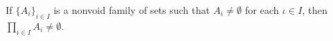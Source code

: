 If \(\{A_i\}_{i \in I}\) is a nonvoid family of sets such that \(A_i \neq \emptyset\) for each \(\iota \in I\), then \(\prod_{i \in I} A_i \neq \emptyset\).